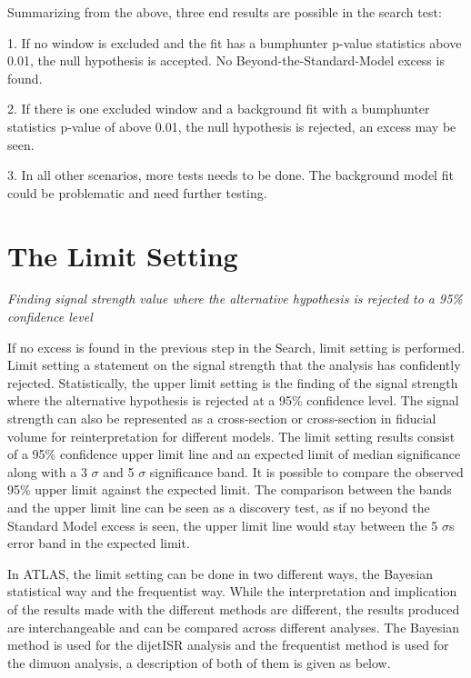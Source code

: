     Summarizing from the above, three end results are possible in the search test:

    1. If no window is excluded and the fit has a bumphunter p-value statistics above 0.01, the null hypothesis is accepted. No Beyond-the-Standard-Model excess is found. 

    2. If there is one excluded window and a background fit with a bumphunter statistics p-value of above 0.01, the null hypothesis is rejected, an excess may be seen. 

    3. In all other scenarios, more tests needs to be done. The background model fit could be problematic and need further testing.  

\section{The Limit Setting}
\label{sec:limits}

\textit{Finding signal strength value where the alternative hypothesis is rejected to a 95\% confidence level}

If no excess is found in the previous step in the Search, limit setting is performed. Limit setting a statement on the signal strength that the analysis has confidently rejected. Statistically, the upper limit setting is the finding of the signal strength where the alternative hypothesis is rejected at a 95\% confidence level. The signal strength can also be represented as a cross-section or cross-section in fiducial volume for reinterpretation for different models. 
The limit setting results consist of a 95\% confidence upper limit line and an expected limit of median significance along with a 3 $\sigma$ and 5 $\sigma$ significance band. It is possible to compare the observed 95\% upper limit against the expected limit. The comparison between the bands and the upper limit line can be seen as a discovery test, as if no beyond the Standard Model excess is seen, the upper limit line would stay between the 5 $\sigma$s error band in the expected limit. 

In ATLAS, the limit setting can be done in two different ways, the Bayesian statistical way and the frequentist way. While the interpretation and implication of the results made with the different methods are different, the results produced are interchangeable and can be compared across different analyses. 
The Bayesian method is used for the dijetISR analysis and the frequentist method is used for the dimuon analysis, a description of both of them is given as below.

